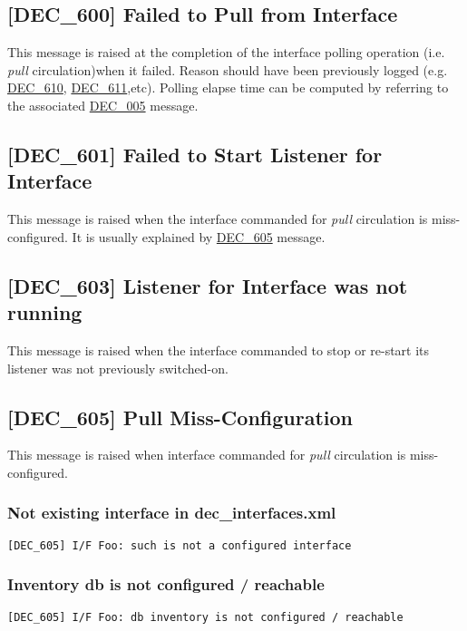 \documentclass[dec_sum_main.tex]{subfiles}
\begin{document}
\label{DEC600}
\subsection{[DEC\_600] Failed to Pull from Interface}
This message is raised at the completion of the interface polling operation (i.e. \textit{pull} circulation)when it failed. Reason should have been previously logged (e.g. \hyperref[DEC610]{DEC\_610}, \hyperref[DEC611]{DEC\_611},etc). Polling elapse time can be computed by referring to the associated \hyperref[DEC005]{DEC\_005} message. 

\label{DEC601}
\subsection{[DEC\_601] Failed to Start Listener for Interface}
This message is raised when the interface commanded for \textit{pull} circulation is miss-configured. It is usually explained by \hyperref[DEC605]{DEC\_605} message. 

\label{DEC603}
\subsection{[DEC\_603] Listener for Interface was not running}
This message is raised when the interface commanded to stop or re-start its listener was not previously switched-on.

\label{DEC605}
\subsection{[DEC\_605] Pull Miss-Configuration}
This message is raised when interface commanded for \textit{pull} circulation is miss-configured.

\subsubsection{Not existing interface in dec\_interfaces.xml }
\begin{verbatim}
[DEC_605] I/F Foo: such is not a configured interface
\end{verbatim}

\subsubsection{Inventory db is not configured / reachable }
\begin{verbatim}
[DEC_605] I/F Foo: db inventory is not configured / reachable
\end{verbatim}
\end{document}
